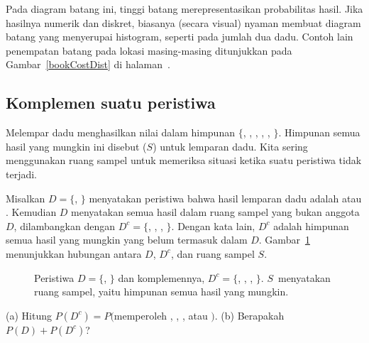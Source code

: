 Pada diagram batang ini, tinggi batang merepresentasikan probabilitas hasil. Jika hasilnya numerik dan diskret, biasanya (secara visual) nyaman membuat diagram batang yang menyerupai histogram, seperti pada jumlah dua dadu. Contoh lain penempatan batang pada lokasi masing-masing ditunjukkan pada Gambar~\ref{bookCostDist} di halaman~\pageref{bookCostDist}.

\subsection{Komplemen suatu peristiwa}

Melempar dadu menghasilkan nilai dalam himpunan $\{$, , , , , $\}$. Himpunan semua hasil yang mungkin ini disebut  ($S$) untuk lemparan dadu. Kita sering menggunakan ruang sampel untuk memeriksa situasi ketika suatu peristiwa tidak terjadi.

Misalkan $D=\{$, $\}$ menyatakan peristiwa bahwa hasil lemparan dadu adalah  atau . Kemudian  $D$ menyatakan semua hasil dalam ruang sampel yang bukan anggota $D$, dilambangkan dengan $D^c = \{$, , , $\}$. Dengan kata lain, $D^c$ adalah himpunan semua hasil yang mungkin yang belum termasuk dalam $D$. Gambar~\ref{complementOfD} menunjukkan hubungan antara $D$, $D^c$, dan ruang sampel $S$.

\begin{figure}[hht]
  \centering
  \caption{Peristiwa $D=\{$, $\}$ dan komplemennya,
      $D^c = \{$, , , $\}$.
      $S$~menyatakan ruang sampel, yaitu himpunan
      semua hasil yang mungkin.}
  \label{complementOfD}
\end{figure}

\begin{exercisewrap}
\begin{nexercise}
(a) Hitung $P(D^c) = P($memperoleh , , , atau $)$. (b) Berapakah $P(D) + P(D^c)$?\footnotemark
\end{nexercise}
\end{exercisewrap}

